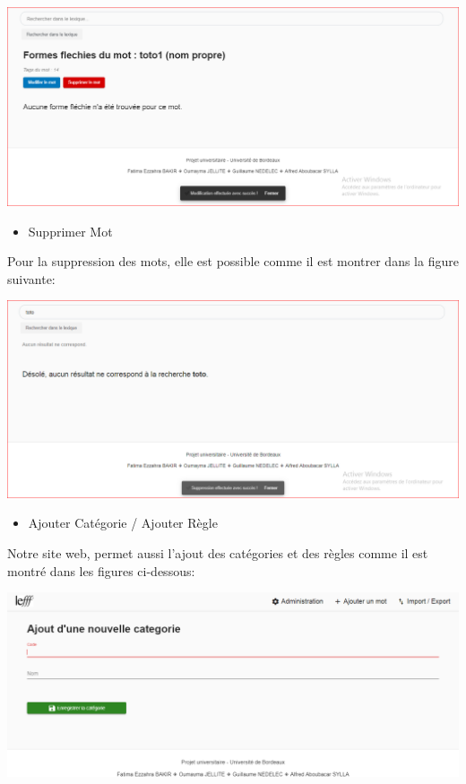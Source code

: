 \documentclass[12pt,a4paper]{article}
\begin{document}
\includegraphics[width=150mm]{img/ModificationEffectuer.PNG}


\begin{itemize}  
  \item Supprimer Mot
\end{itemize}
Pour la suppression des mots, elle est possible comme il est montrer dans la figure suivante:

\includegraphics[width=150mm]{img/SuppressionEffectuer.PNG}


\begin{itemize}  
  \item Ajouter Catégorie / Ajouter Règle 
\end{itemize}

Notre site web, permet aussi l'ajout des catégories et des règles comme il est montré dans les figures ci-dessous: 


 \includegraphics[width=150mm]{img/AjouterCat.PNG}
\end{document}
